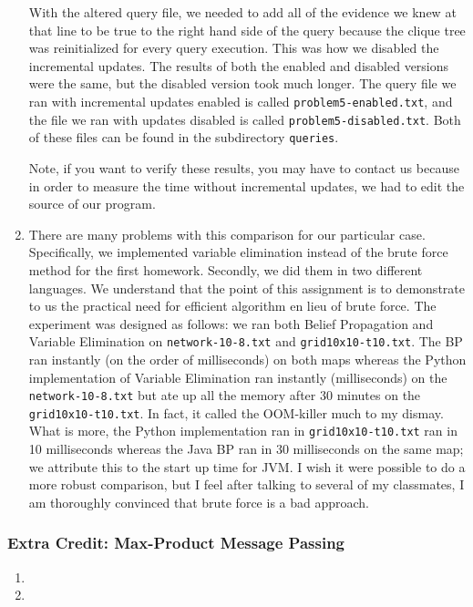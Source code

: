 \documentclass[11pt,a4paper]{article}
\begin{document}
\begin{enumerate}
		With the altered query file, we needed to add all of the evidence we knew at that
		line to be true to the right hand side of the query because the clique tree was
		reinitialized for every query execution. This was how we disabled the incremental
		updates. The results of both the enabled and disabled versions were the same, but
		the disabled version took much longer. The query file we ran with incremental
		updates enabled is called {\tt problem5-enabled.txt}, and the file we ran with
		updates disabled is called {\tt problem5-disabled.txt}. Both of these files can be
		found in the subdirectory {\tt queries}. 
		
		Note, if you want to verify these results, you may have to contact us because
		in order to measure the time without incremental updates, we had to edit the
		source of our program.
		
		\item 
		There are many problems with this comparison for our particular case. Specifically, 
		we implemented variable elimination instead of the brute force method for the first homework.
		 Secondly, we did them in two different languages. We understand that the point of this 
		 assignment is to demonstrate to us the practical need for efficient algorithm en lieu 
		 of brute force. The experiment was designed as follows: we ran both Belief Propagation
		 and Variable Elimination on \texttt{network-10-8.txt} and \texttt{grid10x10-t10.txt}. 
		 The BP ran instantly (on the order of milliseconds) on both maps whereas the Python
		 implementation of Variable Elimination ran instantly (milliseconds) on the
		 \texttt{network-10-8.txt} but ate up all the memory after 30 minutes on the 
		 \texttt{grid10x10-t10.txt}. In fact, it called the OOM-killer much to my dismay. 
		 What is more, the Python implementation ran in \texttt{grid10x10-t10.txt} ran in 
		 10 milliseconds whereas the Java BP ran in 30 milliseconds on the same map; we 
		 attribute this to the start up time for JVM. I wish it were possible to do a more robust 
		 comparison, but I feel after talking to several of my classmates, I am thoroughly convinced 
		 that brute force is a bad approach. 
	\end{enumerate}
	
	\subsubsection{Extra Credit: Max-Product Message Passing}
	
	\begin{enumerate}
		\item
		\item 
	\end{enumerate}
	
\end{document}
